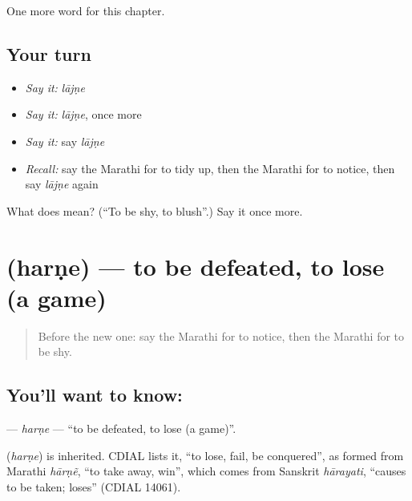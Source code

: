 \begin{grammarlens}[title={What you've built}]
One more word for this chapter.
\end{grammarlens}

\subsection*{Your turn}
\begin{itemize}
\raggedright
  \item \emph{Say it:} \emph{lājṇe}
  \item \emph{Say it:} \emph{lājṇe}, once more
  \item \emph{Say it:} say \emph{lājṇe}
  \item \emph{Recall:} say the Marathi for to tidy up, then the Marathi for to notice, then say \emph{lājṇe} again
\end{itemize}

\begin{tcolorbox}[breakable,colback=teal!4,colframe=teal!35!black,title={Before you move on}]
What does  mean? (\textquotedblleft{}To be shy, to blush\textquotedblright{}.) Say it once more.
\end{tcolorbox}
\section[\texorpdfstring{\mr{हरणे} (harṇe)}{हरणे (harṇe)}]{ (harṇe) — to be defeated, to lose (a game)}

\label{lesson:MR-C168-harne}



\begin{quote}
Before the new one: say the Marathi for to notice, then the Marathi for to be shy.
\end{quote}

\subsection*{You'll want to know: }
\textbf{} — \emph{harṇe} — \textquotedblleft{}to be defeated, to lose (a game)\textquotedblright{}.

\begin{cousinweb}
\textbf{} (\emph{harṇe}) is inherited. CDIAL lists it, \textquotedblleft{}to lose, fail, be conquered\textquotedblright{}, as formed from Marathi \emph{hārṇẽ}, \textquotedblleft{}to take away, win\textquotedblright{}, which comes from Sanskrit \emph{hārayati}, \textquotedblleft{}causes to be taken; loses\textquotedblright{} (CDIAL 14061).
\end{cousinweb}

